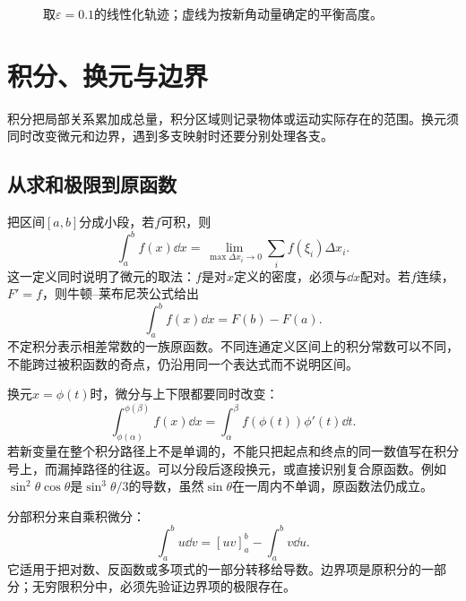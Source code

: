 \begin{solution}
\begin{figure}[H]
\caption{取$\varepsilon=0.1$的线性化轨迹；虚线为按新角动量确定的平衡高度。}\label{fig:c1-v2-s}
\end{figure}
\end{solution}


\section{积分、换元与边界}\label{sec:c1-integral}
积分把局部关系累加成总量，积分区域则记录物体或运动实际存在的范围。换元须同时改变微元和边界，遇到多支映射时还要分别处理各支。

\subsection{从求和极限到原函数}
把区间$[a,b]$分成小段，若$f$可积，则
\[\int_a^b f(x)\dd x=\lim_{\max\Delta x_i\to0}\sum_i f(\xi_i)\Delta x_i.
\]
这一定义同时说明了微元的取法：$f$是对$x$定义的密度，必须与$\dd x$配对。若$f$连续，$F'=f$，则牛顿--莱布尼茨公式给出
\begin{equation}\int_a^b f(x)\dd x=F(b)-F(a).
\end{equation}
不定积分表示相差常数的一族原函数。不同连通定义区间上的积分常数可以不同，不能跨过被积函数的奇点，仍沿用同一个表达式而不说明区间。

换元$x=\phi(t)$时，微分与上下限都要同时改变：
\begin{equation}\label{eq:c1-substitution}
\int_{\phi(\alpha)}^{\phi(\beta)}f(x)\dd x
=\int_\alpha^\beta f(\phi(t))\phi'(t)\dd t.
\end{equation}
若新变量在整个积分路径上不是单调的，不能只把起点和终点的同一数值写在积分号上，而漏掉路径的往返。可以分段后逐段换元，或直接识别复合原函数。例如$\sin^2\theta\cos\theta$是$\sin^3\theta/3$的导数，虽然$\sin\theta$在一周内不单调，原函数法仍成立。

分部积分来自乘积微分：
\begin{equation}\label{eq:c1-parts}
\int_a^b u\dd v=[uv]_a^b-\int_a^b v\dd u.
\end{equation}
它适用于把对数、反函数或多项式的一部分转移给导数。边界项是原积分的一部分；无穷限积分中，必须先验证边界项的极限存在。

